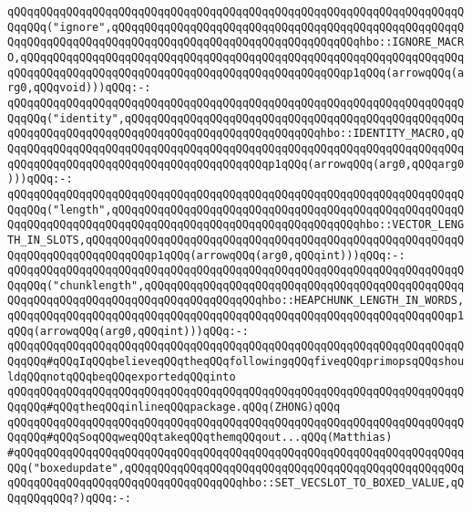 \verb|qQQqqQQqqQQqqQQqqQQqqQQqqQQqqQQqqQQqqQQqqQQqqQQqqQQqqQQqqQQqqQQqqQQqqQQqqQQq("ignore",qQQqqQQqqQQqqQQqqQQqqQQqqQQqqQQqqQQqqQQqqQQqqQQqqQQqqQQqqQQqqQQqqQQqqQQqqQQqqQQqqQQqqQQqqQQqqQQqqQQqqQQqqQQqhbo::IGNORE_MACRO,qQQqqQQqqQQqqQQqqQQqqQQqqQQqqQQqqQQqqQQqqQQqqQQqqQQqqQQqqQQqqQQqqQQqqQQqqQQqqQQqqQQqqQQqqQQqqQQqqQQqqQQqqQQqqQQqqQQqqQQqp1qQQq(arrowqQQq(arg0,qQQqvoid)))qQQq:-:|\newline
\verb|qQQqqQQqqQQqqQQqqQQqqQQqqQQqqQQqqQQqqQQqqQQqqQQqqQQqqQQqqQQqqQQqqQQqqQQqqQQq("identity",qQQqqQQqqQQqqQQqqQQqqQQqqQQqqQQqqQQqqQQqqQQqqQQqqQQqqQQqqQQqqQQqqQQqqQQqqQQqqQQqqQQqqQQqqQQqqQQqqQQqhbo::IDENTITY_MACRO,qQQqqQQqqQQqqQQqqQQqqQQqqQQqqQQqqQQqqQQqqQQqqQQqqQQqqQQqqQQqqQQqqQQqqQQqqQQqqQQqqQQqqQQqqQQqqQQqqQQqqQQqqQQqqQQqp1qQQq(arrowqQQq(arg0,qQQqarg0)))qQQq:-:|\newline
\newline
\newline
\verb|qQQqqQQqqQQqqQQqqQQqqQQqqQQqqQQqqQQqqQQqqQQqqQQqqQQqqQQqqQQqqQQqqQQqqQQqqQQq("length",qQQqqQQqqQQqqQQqqQQqqQQqqQQqqQQqqQQqqQQqqQQqqQQqqQQqqQQqqQQqqQQqqQQqqQQqqQQqqQQqqQQqqQQqqQQqqQQqqQQqqQQqqQQqhbo::VECTOR_LENGTH_IN_SLOTS,qQQqqQQqqQQqqQQqqQQqqQQqqQQqqQQqqQQqqQQqqQQqqQQqqQQqqQQqqQQqqQQqqQQqqQQqqQQqqQQqp1qQQq(arrowqQQq(arg0,qQQqint)))qQQq:-:|\newline
\verb|qQQqqQQqqQQqqQQqqQQqqQQqqQQqqQQqqQQqqQQqqQQqqQQqqQQqqQQqqQQqqQQqqQQqqQQqqQQq("chunklength",qQQqqQQqqQQqqQQqqQQqqQQqqQQqqQQqqQQqqQQqqQQqqQQqqQQqqQQqqQQqqQQqqQQqqQQqqQQqqQQqqQQqqQQqhbo::HEAPCHUNK_LENGTH_IN_WORDS,qQQqqQQqqQQqqQQqqQQqqQQqqQQqqQQqqQQqqQQqqQQqqQQqqQQqqQQqqQQqqQQqqQQqp1qQQq(arrowqQQq(arg0,qQQqint)))qQQq:-:|\newline
\newline
\verb|qQQqqQQqqQQqqQQqqQQqqQQqqQQqqQQqqQQqqQQqqQQqqQQqqQQqqQQqqQQqqQQqqQQqqQQqqQQq#qQQqIqQQqbelieveqQQqtheqQQqfollowingqQQqfiveqQQqprimopsqQQqshouldqQQqnotqQQqbeqQQqexportedqQQqinto|\newline
\verb|qQQqqQQqqQQqqQQqqQQqqQQqqQQqqQQqqQQqqQQqqQQqqQQqqQQqqQQqqQQqqQQqqQQqqQQqqQQq#qQQqtheqQQqinlineqQQqpackage.qQQq(ZHONG)qQQq|\newline
\newline
\verb|qQQqqQQqqQQqqQQqqQQqqQQqqQQqqQQqqQQqqQQqqQQqqQQqqQQqqQQqqQQqqQQqqQQqqQQqqQQq#qQQqSoqQQqweqQQqtakeqQQqthemqQQqout...qQQq(Matthias)|\newline
\newline
\verb|#qQQqqQQqqQQqqQQqqQQqqQQqqQQqqQQqqQQqqQQqqQQqqQQqqQQqqQQqqQQqqQQqqQQqqQQq("boxedupdate",qQQqqQQqqQQqqQQqqQQqqQQqqQQqqQQqqQQqqQQqqQQqqQQqqQQqqQQqqQQqqQQqqQQqqQQqqQQqqQQqqQQqqQQqhbo::SET_VECSLOT_TO_BOXED_VALUE,qQQqqQQqqQQq?)qQQq:-:|\newline
